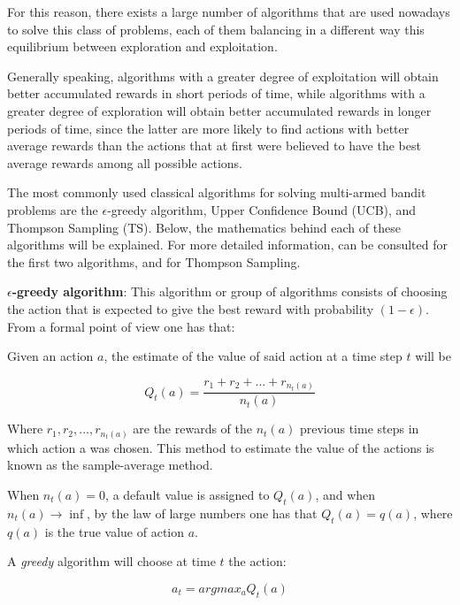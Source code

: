 \documentclass[../main.tex]{subfiles}
\begin{document}
For this reason, there exists a large number of algorithms that are used nowadays to
solve this class of problems, each of them balancing in a different way this
equilibrium between exploration and exploitation.  

Generally speaking, algorithms with a greater degree of exploitation will obtain
better accumulated rewards in short periods of time, while algorithms with a greater
degree of exploration will obtain better accumulated rewards in longer periods of
time, since the latter are more likely to find actions with better average rewards
than the actions that at first were believed to have the best average rewards among
all possible actions.  

The most commonly used classical algorithms for solving multi-armed bandit problems
are the $\epsilon$-greedy algorithm, Upper Confidence Bound (UCB), and Thompson
Sampling (TS). Below, the mathematics behind each of these algorithms will be
explained. For more detailed information, \textcite{sutton2018} can be consulted for
the first two algorithms, and \textcite{russo2017} for Thompson Sampling.  

\textbf{$\epsilon$-greedy algorithm}: This algorithm or group of algorithms consists
of choosing the action that is expected to give the best reward with probability 
$\left(1 - \epsilon\right)$. From a formal point of view one has that:  

Given an action $a$, the estimate of the value of said action at a time step $t$ will
be  

\begin{equation*}
    Q_{t}\left(a\right) = \dfrac{r_{1} + r_{2} + ... + r_{n_{t}\left(a\right)}}{n_{t}\left(a\right)}
\end{equation*}

Where $r_{1}, r_{2}, ..., r_{n_{t}\left(a\right)}$ are the rewards of the 
$n_{t}\left(a\right)$ previous time steps in which action a was chosen. This method 
to estimate the value of the actions is known as the sample-average method.  

When $n_{t}\left(a\right) = 0$, a default value is assigned to $Q_{t}\left(a\right)$,
and when $n_{t}\left(a\right) \rightarrow \inf$, by the law of large numbers one has
that $Q_{t}\left(a\right) = q\left(a\right)$, where $q\left(a\right)$ is the true
value of action $a$.  

A \textit{greedy} algorithm will choose at time $t$ the action:  

\begin{equation*}
    a_{t} = argmax_{a} Q_{t}\left(a\right)
\end{equation*}
\end{document}
